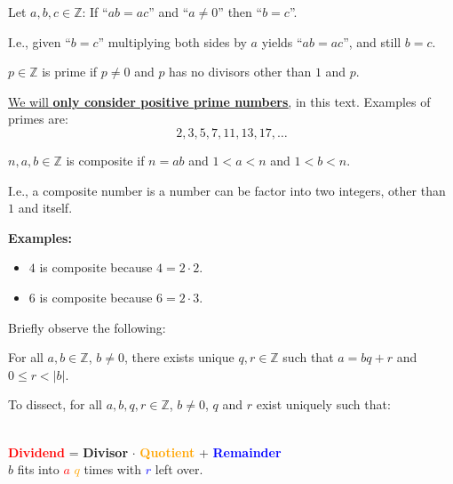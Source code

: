 \begin{Def}

    Let $a,b,c\in\mathbb{Z}$: If ``$ab=ac$'' and ``$a\neq 0$'' then ``$b=c$''.

\end{Def}

\noindent
I.e., given ``$b=c$'' multiplying both sides by $a$ yields ``$ab=ac$'', and still $b=c$.

\newpage

\begin{Def}

    $p\in\mathbb{Z}$ is prime if $p\neq 0$ and $p$ has no divisors other than $1$ and $p$.
\end{Def}
\underline{We will \textbf{only consider positive prime numbers},} in this text. Examples of primes are:
$$2,3,5,7,11,13,17,\dots$$

\begin{Def}

    $n,a,b\in\mathbb{Z}$ is composite if $n=ab$ and $1<a<n$ and $1<b<n$.
\end{Def}
I.e., a composite number is a number can be factor into two integers, other than $1$ and itself.

\noindent
\textbf{Examples:}
\begin{itemize}
    \item $4$ is composite because $4=2\cdot2$.
    \item $6$ is composite because $6=2\cdot3$.
\end{itemize}

\noindent
Briefly observe the following:
\begin{theo}

    For all $a,b\in\mathbb{Z}$, $b\neq0$, there exists unique $q,r\in\mathbb{Z}$ such that $a=bq+r$ and $0\leq r<|b|$.
\end{theo}

\noindent
To dissect, for all $a,b,q,r\in\mathbb{Z}$, $b\neq0$, $q$ and $r$ exist uniquely such that:

\begin{center}
    \\
    \vspace*{.5em}
    \LARGE{\textcolor{red}{\textbf{Dividend}} = \textcolor{OliveGreen}{\textbf{Divisor}} $\cdot$ \textcolor{orange}{\textbf{Quotient}} + \textcolor{blue}{\textbf{Remainder}}}\\
    \Large{\textcolor{OliveGreen}{$b$} fits into \textcolor{red}{$a$} \textcolor{orange}{$q$} times with \textcolor{blue}{$r$} left over.}
\end{center}

